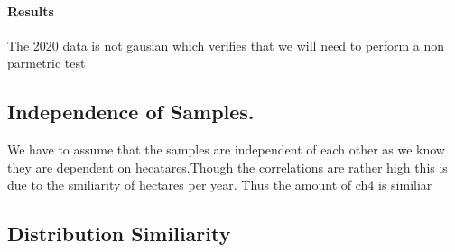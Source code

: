 \documentclass[letterpaper,10pt,english]{jupyterBook}
\begin{document}
\paragraph{Results}
\label{\detokenize{notebooks/testing_malaysian_paper:id3}}
\sphinxAtStartPar
The 2020 data is not gausian which verifies that we will need to perform a non parmetric test


\subsection{Independence of Samples.}
\label{\detokenize{notebooks/testing_malaysian_paper:independence-of-samples}}
\sphinxAtStartPar
We have to assume that the samples are independent of each other as we know they are dependent on hecatares.Though the correlations are rather high this is due to the smiliarity of hectares per year.  Thus the amount of ch4 is similiar


\subsection{Distribution Similiarity}
\label{\detokenize{notebooks/testing_malaysian_paper:distribution-similiarity}}
\end{document}
